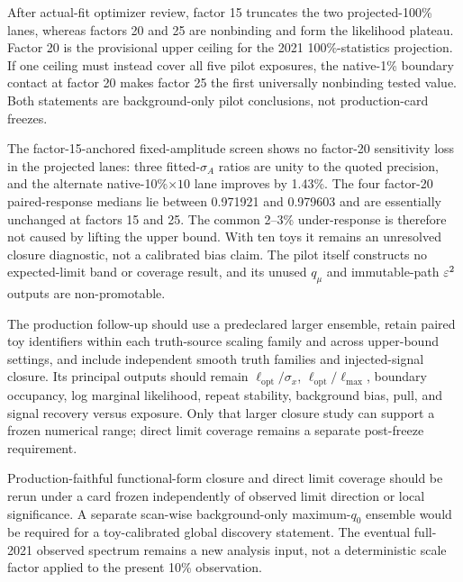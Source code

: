 After actual-fit optimizer review, factor 15 truncates the two projected-100\% lanes,
whereas factors 20 and 25 are nonbinding and form the likelihood plateau. Factor 20
is the provisional upper ceiling for the 2021 100\%-statistics projection. If one
ceiling must instead cover all five pilot exposures, the native-1\% boundary contact
at factor 20 makes factor 25 the first universally nonbinding tested value. Both
statements are background-only pilot conclusions, not production-card freezes.

The factor-15-anchored fixed-amplitude screen shows no factor-20 sensitivity loss in
the projected lanes: three fitted-$\sigma_A$ ratios are unity to the quoted precision,
and the alternate native-10\%$\times10$ lane improves by 1.43\%. The four factor-20
paired-response medians lie between 0.971921 and 0.979603 and are essentially unchanged
at factors 15 and 25. The common 2--3\% under-response is therefore not caused by
lifting the upper bound. With ten toys it remains an unresolved closure diagnostic,
not a calibrated bias claim. The pilot itself constructs no expected-limit band or
coverage result, and its unused $q_\mu$ and immutable-path $\varepsilon^2$ outputs are
non-promotable.

The production follow-up should use a predeclared larger ensemble, retain paired toy
identifiers within each truth-source scaling family and across upper-bound settings,
and include independent smooth truth families and injected-signal closure. Its
principal outputs should remain $\ell_{\mathrm{opt}}/\sigma_x$,
$\ell_{\mathrm{opt}}/\ell_{\max}$, boundary occupancy, log marginal likelihood,
repeat stability, background bias, pull, and signal recovery versus exposure. Only
that larger closure study can support a frozen numerical range; direct limit coverage
remains a separate post-freeze requirement.

Production-faithful functional-form closure and direct limit coverage should be
rerun under a card frozen independently of observed limit direction or local
significance. A separate scan-wise
background-only maximum-$q_0$ ensemble would be required for a toy-calibrated global
discovery statement. The eventual full-2021 observed spectrum remains a new analysis
input, not a deterministic scale factor applied to the present 10\% observation.
